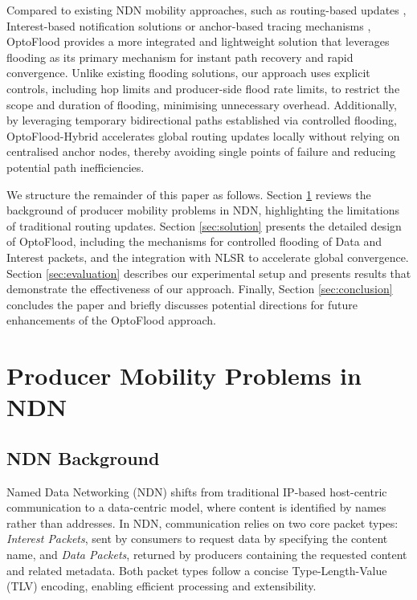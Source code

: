 \documentclass[conference]{IEEEtran}
\begin{document}
Compared to existing NDN mobility approaches, such as routing-based updates \cite{meddeb:2018:afirm}, Interest-based notification solutions \cite{auge:2016:map-me} or anchor-based tracing mechanisms \cite{zhang:2018:kite},
OptoFlood provides a more integrated and lightweight solution that leverages flooding as its primary mechanism for instant path recovery and rapid convergence. Unlike existing flooding solutions, our approach uses explicit controls, including hop limits and producer-side flood rate limits, to restrict the scope and duration of flooding, minimising unnecessary overhead. Additionally, by leveraging temporary bidirectional paths established via controlled flooding, OptoFlood-Hybrid accelerates global routing updates locally without relying on centralised anchor nodes, thereby avoiding single points of failure and reducing potential path inefficiencies.

We structure the remainder of this paper as follows. Section \ref{sec:problem} reviews the background of producer mobility problems in NDN, highlighting the limitations of traditional routing updates. Section \ref{sec:solution} presents the detailed design of OptoFlood, including the mechanisms for controlled flooding of Data and Interest packets, and the integration with NLSR to accelerate global convergence. Section \ref{sec:evaluation} describes our experimental setup and presents results that demonstrate the effectiveness of our approach. Finally, Section \ref{sec:conclusion} concludes the paper and briefly discusses potential directions for future enhancements of the OptoFlood approach.


\section{Producer Mobility Problems in NDN}
\label{sec:problem}

\subsection{NDN Background}

Named Data Networking (NDN) shifts from traditional IP-based host-centric communication to a data-centric model, where content is identified by names rather than addresses. In NDN, communication relies on two core packet types: \textit{Interest Packets}, sent by consumers to request data by specifying the content name, and \textit{Data Packets}, returned by producers containing the requested content and related metadata. Both packet types follow a concise Type-Length-Value (TLV) encoding, enabling efficient processing and extensibility.
\end{document}
